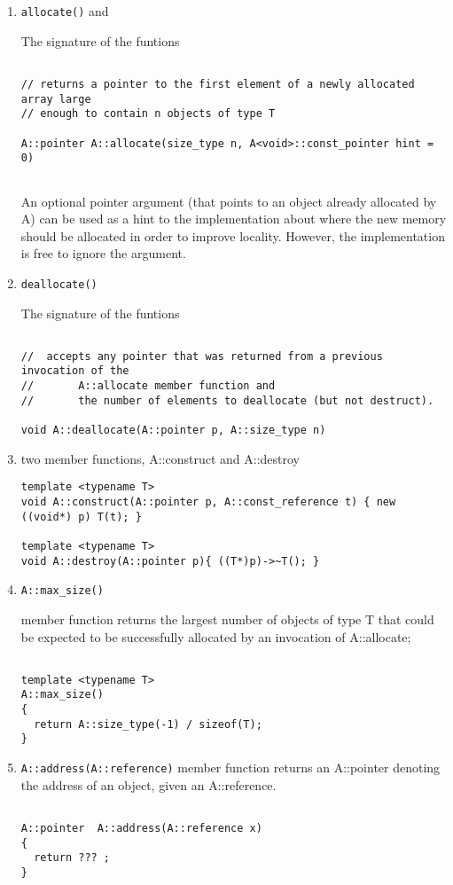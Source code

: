 \begin{enumerate}
  
  \item  \verb!allocate()! and
  
The signature of the funtions
\begin{lstlisting}

// returns a pointer to the first element of a newly allocated array large
// enough to contain n objects of type T

A::pointer A::allocate(size_type n, A<void>::const_pointer hint = 0)


\end{lstlisting}

An optional pointer argument (that points to an object already allocated by A)
can be used as a hint to the implementation about where the new memory should be
allocated in order to improve locality. However, the implementation is free to
ignore the argument.
 
  
  \item   \verb!deallocate()!
  
The signature of the funtions
\begin{lstlisting}

//  accepts any pointer that was returned from a previous invocation of the
//       A::allocate member function and 
//       the number of elements to deallocate (but not destruct).

void A::deallocate(A::pointer p, A::size_type n)
\end{lstlisting}


  \item two member functions, A::construct and A::destroy
  
  
\begin{lstlisting}
template <typename T>
void A::construct(A::pointer p, A::const_reference t) { new ((void*) p) T(t); }

template <typename T>
void A::destroy(A::pointer p){ ((T*)p)->~T(); }
\end{lstlisting}


  \item \verb!A::max_size()!
  
  
member function returns the largest number of objects of type T that could be expected to be successfully allocated by an invocation of A::allocate;
\begin{verbatim}

template <typename T>
A::max_size()
{
  return A::size_type(-1) / sizeof(T);
}
\end{verbatim}

   \item \verb!A::address(A::reference)! member function returns an A::pointer denoting the address of an object, given an A::reference.
  
\begin{verbatim}

A::pointer  A::address(A::reference x)
{
  return ??? ;
}

\end{verbatim}
\end{enumerate}




